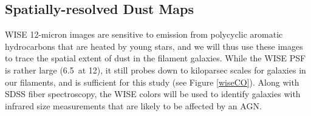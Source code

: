 \documentclass[11pt, preprint]{aastex}
\begin{document}
{%




\vspace*{-1cm}
\subsection{Spatially-resolved Dust Maps}
\vspace*{-.3cm}
\label{wise}
WISE 12-micron images are sensitive to emission from polycyclic
aromatic hydrocarbons that are heated by young stars, and we will thus
use these images to trace the spatial extent of dust in the filament
galaxies.  
While the WISE PSF is rather large
(6.5\arcsec \ at 12\micron), it
still probes down to kiloparsec scales for galaxies in our filaments,
and is sufficient for this study (see Figure \ref{wiseCO}).   Along with SDSS fiber
spectroscopy, the WISE colors will be used to identify galaxies with
infrared size measurements that are likely to be affected by an AGN.


}
\end{document}
